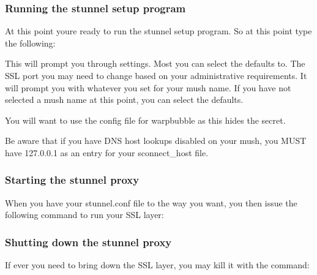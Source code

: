 \documentclass[letterpaper,10pt,english]{sphinxmanual}
\begin{document}
\subsubsection{Running the stunnel setup program}
\label{\detokenize{security:running-the-stunnel-setup-program}}
\sphinxAtStartPar
At this point you\textquotesingle{}re ready to run the stunnel setup program.  So at this point type the following:

\begin{sphinxVerbatim}[commandchars=\\\{\}]
\end{sphinxVerbatim}

\sphinxAtStartPar
This will prompt you through settings.  Most you can select the defaults to.
The SSL port you may need to change based on your administrative requirements.
It will prompt you with whatever you set for your mush name.  If you have not
selected a mush name at this point, you can select the defaults.

\sphinxAtStartPar
You will want to use the config file for warpbubble as this hides the secret.

\sphinxAtStartPar
Be aware that if you have DNS host lookups disabled on your mush, you
MUST have 127.0.0.1 as an entry for your sconnect\_host file.


\subsubsection{Starting the stunnel proxy}
\label{\detokenize{security:starting-the-stunnel-proxy}}
\sphinxAtStartPar
When you have your stunnel.conf file to the way you want, you then
issue the following command to run your SSL layer:

\begin{sphinxVerbatim}[commandchars=\\\{\}]
\end{sphinxVerbatim}


\subsubsection{Shutting down the stunnel proxy}
\label{\detokenize{security:shutting-down-the-stunnel-proxy}}
\sphinxAtStartPar
If ever you need to bring down the SSL layer, you may kill it with the command:

\begin{sphinxVerbatim}[commandchars=\\\{\}]
\end{sphinxVerbatim}
\end{document}
